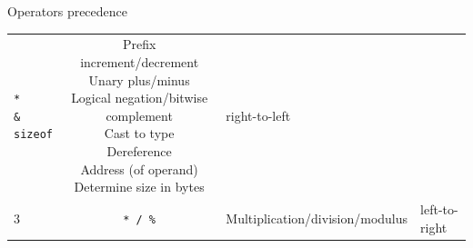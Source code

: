 \begin{frame}{Operators precedence}
{\begin{tabular}{l|c|l|l}
{                \texttt{*}                          \\
                \texttt{\&}                         \\
                \texttt{sizeof}                     \\
            } &
            \specialcellhl{
                Prefix increment/decrement          \\
                Unary plus/minus                    \\
                Logical negation/bitwise complement \\
                Cast to type                        \\
                Dereference                         \\
                Address (of operand)                \\
                Determine size in bytes             \\
            } & right-to-left                       \\
            3 &
            \texttt{* / \%} &
            Multiplication/division/modulus &
            left-to-right                           \\
        \end{tabular}
    }

\end{frame}
